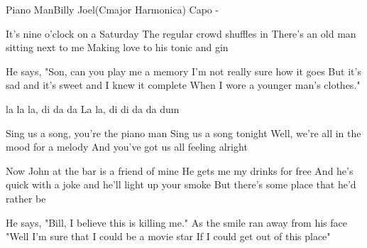 \begin{song}{Piano Man}{Billy Joel}{(Cmajor Harmonica) Capo -}


    It's nine o'clock on a Saturday
    The regular crowd shuffles in
    There's an old man sitting next to me
    Making love to his tonic and gin


    He says, "Son, can you play me a memory
    I'm not really sure how it goes
    But it's sad and it's sweet and I knew it complete
    When I wore a younger man's clothes."

    la la la, di da da
    La la, di di da da dum

    Sing us a song, you're the piano man
    Sing us a song tonight
    Well, we're all in the mood for a melody
    And you've got us all feeling alright


    Now John at the bar is a friend of mine
    He gets me my drinks for free
    And he's quick with a joke and he'll light up your smoke
    But there's some place that he'd rather be

    He says, "Bill, I believe this is killing me."
    As the smile ran away from his face
    "Well I'm sure that I could be a movie star
    If I could get out of this place"


\end{song}
